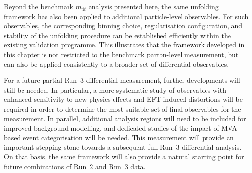Beyond the benchmark $m_{4t}$ analysis presented here, the same unfolding framework has also been applied to additional particle-level observables. 
For such observables, the corresponding binning choice, regularisation configuration, and stability of the unfolding procedure can be established efficiently within the existing validation programme. 
This illustrates that the framework developed in this chapter is not restricted to the benchmark parton-level measurement, but can also be applied consistently to a broader set of differential observables.

For a future partial Run~3 differential measurement, further developments will still be needed. 
In particular, a more systematic study of observables with enhanced sensitivity to new-physics effects and EFT-induced distortions will be required in order to determine the most suitable set of final observables for the measurement. 
In parallel, additional analysis regions will need to be included for improved background modelling, and dedicated studies of the impact of MVA-based event categorisation will be needed. 
This measurement will provide an important stepping stone towards a subsequent full Run~3 differential analysis. 
On that basis, the same framework will also provide a natural starting point for future combinations of Run~2 and Run~3 data.